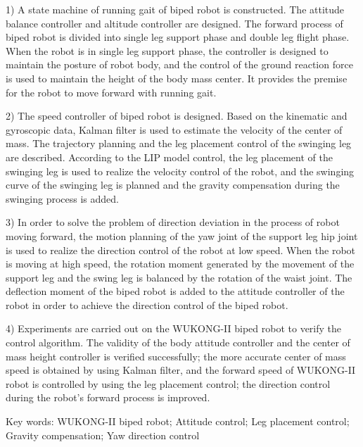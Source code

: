 1) A state machine of running gait of biped robot is constructed. The attitude balance
controller and altitude controller are designed. The forward process of biped robot is
divided into single leg support phase and double leg flight phase. When the robot is
in single leg support phase, the controller is designed to maintain the posture of robot
body, and the control of the ground reaction force is used to maintain the height of
the body mass center. It provides the premise for the robot to move forward with
running gait.

2) The speed controller of biped robot is designed. Based on the kinematic and gyroscopic
data, Kalman filter is used to estimate the velocity of the center of mass. The
trajectory planning and the leg placement control of the swinging leg are described.
According to the LIP model control, the leg placement of the swinging leg is used to
realize the velocity control of the robot, and the swinging curve of the swinging leg
is planned and the gravity compensation during the swinging process is added.

3) In order to solve the problem of direction deviation in the process of robot moving
forward, the motion planning of the yaw joint of the support leg hip joint is used to
realize the direction control of the robot at low speed. When the robot is moving at
high speed, the rotation moment generated by the movement of the support leg and
the swing leg is balanced by the rotation of the waist joint. The deflection moment of
the biped robot is added to the attitude controller of the robot in order to achieve the
direction control of the biped robot.

4) Experiments are carried out on the WUKONG-II biped robot to verify the control
algorithm. The validity of the body attitude controller and the center of mass height
controller is verified successfully; the more accurate center of mass speed is obtained
by using Kalman filter, and the forward speed of WUKONG-II robot is controlled by
using the leg placement control; the direction control during the robot's forward process
is improved.

Key words: WUKONG-II biped robot; Attitude control; Leg placement control; Gravity
compensation; Yaw direction control